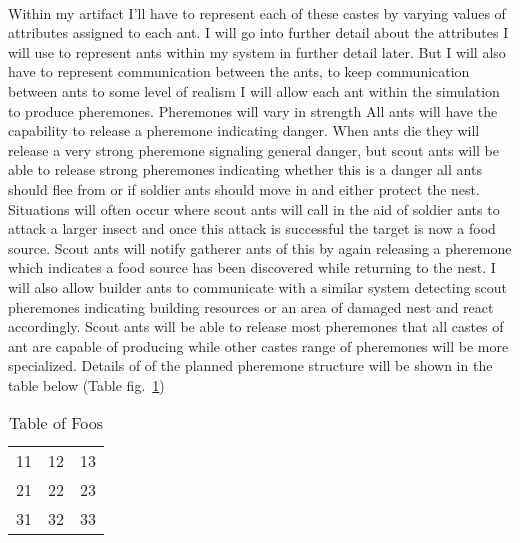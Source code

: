 \documentclass{report}
\begin{document}
\paragraph{}Within my artifact I'll have to represent each of these castes by varying values of attributes assigned to each ant. I will go into further detail about the attributes I will use to represent ants within my system in further detail later. But I will also have to represent communication between the ants, to keep communication between ants to some level of realism I will allow each ant within the simulation to produce pheremones. Pheremones will vary in strength  All ants will have the capability to release a pheremone indicating danger. When ants die they will release a very strong pheremone signaling general danger, but scout ants will be able to release strong pheremones indicating whether this is a danger all ants should flee from or if soldier ants should move in and either protect the nest. Situations will often occur where scout ants will call in the aid of soldier ants to attack a larger insect and once this attack is successful the target is now a food source. Scout ants will notify gatherer ants of this by again releasing a pheremone which indicates a food source has been discovered while returning to the nest. I will also allow builder ants to communicate with a similar system detecting scout pheremones indicating building resources or an area of damaged nest and react accordingly. Scout ants will be able to release most pheremones that all castes of ant are capable of producing while other castes range of pheremones will be more specialized. Details of of the planned pheremone structure will be shown in the table below (Table fig.~\ref{tab:foo})

\begin{table}
\begin{center}
	\begin{tabular}{lll}
		11 & 12 & 13 \\
		21 & 22 & 23 \\
		31 & 32 & 33 \\
	\end{tabular}
	\caption{Table of Foos}
	\label{tab:foo}
\end{center}
\end{table}
\end{document}
